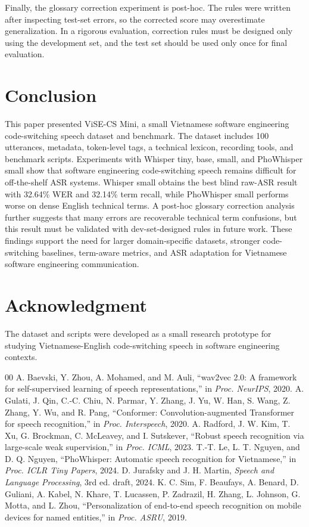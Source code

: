 \documentclass[conference]{IEEEtran}
\begin{document}
Finally, the glossary correction experiment is post-hoc. The rules were written after inspecting test-set errors, so the corrected score may overestimate generalization. In a rigorous evaluation, correction rules must be designed only using the development set, and the test set should be used only once for final evaluation.

\section{Conclusion}
This paper presented ViSE-CS Mini, a small Vietnamese software engineering code-switching speech dataset and benchmark. The dataset includes 100 utterances, metadata, token-level tags, a technical lexicon, recording tools, and benchmark scripts. Experiments with Whisper tiny, base, small, and PhoWhisper small show that software engineering code-switching speech remains difficult for off-the-shelf ASR systems. Whisper small obtains the best blind raw-ASR result with 32.64\% WER and 32.14\% term recall, while PhoWhisper small performs worse on dense English technical terms. A post-hoc glossary correction analysis further suggests that many errors are recoverable technical term confusions, but this result must be validated with dev-set-designed rules in future work. These findings support the need for larger domain-specific datasets, stronger code-switching baselines, term-aware metrics, and ASR adaptation for Vietnamese software engineering communication.

\section*{Acknowledgment}
The dataset and scripts were developed as a small research prototype for studying Vietnamese-English code-switching speech in software engineering contexts.

\begin{thebibliography}{00}
 A. Baevski, Y. Zhou, A. Mohamed, and M. Auli, ``wav2vec 2.0: A framework for self-supervised learning of speech representations,'' in \textit{Proc. NeurIPS}, 2020.
 A. Gulati, J. Qin, C.-C. Chiu, N. Parmar, Y. Zhang, J. Yu, W. Han, S. Wang, Z. Zhang, Y. Wu, and R. Pang, ``Conformer: Convolution-augmented Transformer for speech recognition,'' in \textit{Proc. Interspeech}, 2020.
 A. Radford, J. W. Kim, T. Xu, G. Brockman, C. McLeavey, and I. Sutskever, ``Robust speech recognition via large-scale weak supervision,'' in \textit{Proc. ICML}, 2023.
 T.-T. Le, L. T. Nguyen, and D. Q. Nguyen, ``PhoWhisper: Automatic speech recognition for Vietnamese,'' in \textit{Proc. ICLR Tiny Papers}, 2024.
 D. Jurafsky and J. H. Martin, \textit{Speech and Language Processing}, 3rd ed. draft, 2024.
 K. C. Sim, F. Beaufays, A. Benard, D. Guliani, A. Kabel, N. Khare, T. Lucassen, P. Zadrazil, H. Zhang, L. Johnson, G. Motta, and L. Zhou, ``Personalization of end-to-end speech recognition on mobile devices for named entities,'' in \textit{Proc. ASRU}, 2019.
\end{thebibliography}
\end{document}

